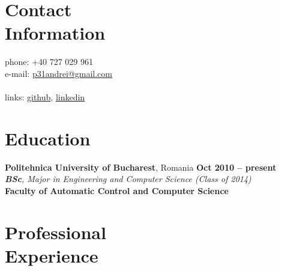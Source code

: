 \documentclass[margin,line]{resume}
\begin{document}
\begin{resume}

    \section{\mysidestyle Contact\\Information}

	phone: +40 727 029 961              \\
	e-mail:  \href{mailto:p31andrei@gmail.com}{p31andrei@gmail.com}  \vspace{0mm}\\\vspace{-4.5mm}\\%
	links: \href{https://github.com/andreip/}{github}, \href{http://www.linkedin.com/profile/view?id=143805798}{linkedin}

    \section{\mysidestyle Education}

	\textbf{Politehnica University of Bucharest}, Romania \hfill \textbf{ Oct 2010 -- present}\vspace{1.2mm}\\%
	\textsl{\textbf{BSc}, Major in Engineering and Computer Science (Class of 2014)}\vspace{1.5mm}\\
	\small{\textbf{Faculty of Automatic Control and Computer Science}}

    \section{\mysidestyle Professional\\Experience}


\end{resume}
\end{document}
